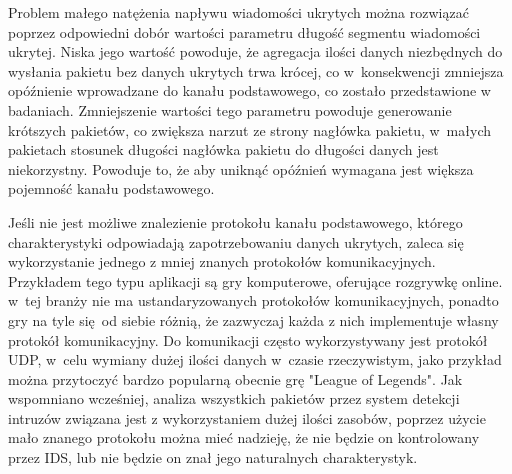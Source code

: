 \documentclass[a4paper, twoside, 12pt]{report}
\begin{document}
       Problem małego natężenia napływu wiadomości ukrytych można rozwiązać poprzez
       odpowiedni dobór wartości parametru długość segmentu wiadomości ukrytej.
       Niska jego wartość powoduje, że agregacja ilości danych niezbędnych do
       wysłania pakietu bez danych ukrytych trwa krócej, co w~konsekwencji zmniejsza
       opóźnienie wprowadzane do kanału podstawowego, co zostało przedstawione w
       badaniach. Zmniejszenie wartości tego parametru powoduje generowanie
       krótszych pakietów, co zwiększa narzut ze strony nagłówka pakietu, w~małych
       pakietach stosunek długości nagłówka pakietu do długości danych jest niekorzystny.
       Powoduje to, że aby uniknąć opóźnień wymagana jest większa pojemność kanału
       podstawowego.

       Jeśli nie jest możliwe znalezienie protokołu kanału podstawowego, którego
       charakterystyki odpowiadają zapotrzebowaniu danych ukrytych, zaleca się
       wykorzystanie jednego z mniej znanych protokołów komunikacyjnych. Przykładem
       tego typu aplikacji są gry komputerowe, oferujące rozgrywkę online. w~tej
       branży nie ma ustandaryzowanych protokołów komunikacyjnych, ponadto gry na
       tyle się od siebie różnią, że zazwyczaj każda z nich implementuje własny
       protokół komunikacyjny. Do komunikacji często wykorzystywany jest protokół
       UDP, w~celu wymiany dużej ilości danych w~czasie rzeczywistym, jako przykład
       można przytoczyć bardzo popularną obecnie grę "League of Legends". Jak wspomniano
       wcześniej, analiza wszystkich pakietów przez system detekcji intruzów
       związana jest z wykorzystaniem dużej ilości zasobów, poprzez użycie mało
       znanego protokołu można mieć nadzieję, że nie będzie on kontrolowany
       przez IDS, lub nie będzie on znał jego naturalnych charakterystyk.
\end{document}
